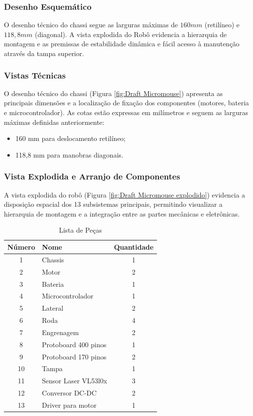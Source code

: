 \subsubsection{Desenho Esquemático}
O desenho técnico do chassi segue as larguras máximas de $160{ mm}$ (retilíneo) e $118,8{ mm}$ (diagonal). A vista explodida do Robô evidencia a hierarquia de montagem e as premissas de estabilidade dinâmica e fácil acesso à manutenção através da tampa
superior.

\subsubsection{Vistas Técnicas}
O desenho técnico do chassi (Figura \ref{fig:Draft Micromouse}) apresenta as principais dimensões e a localização de fixação dos componentes (motores, bateria e microcontrolador). As cotas estão expressas em milímetros e seguem as larguras máximas definidas anteriormente:
\begin{itemize}
    \item 160 mm para deslocamento retilíneo;
    \item 118,8 mm para manobras diagonais.
\end{itemize}

\subsubsection{Vista Explodida e Arranjo de Componentes}
A vista explodida do robô (Figura \ref{fig:Draft Micromouse explodido}) evidencia a disposição espacial dos 13 subsistemas principais, permitindo visualizar a hierarquia de montagem e a integração entre as partes mecânicas e eletrônicas.

\begin{table}[htbp]
\centering
\caption{Lista de Peças}
\label{tab:pecas_micromouse}
\begin{tabular}{@{}clc@{}}
\toprule
\textbf{Número} & \textbf{Nome} & \textbf{Quantidade} \\ \midrule
1 & Chassis & 1 \\
2 & Motor & 2 \\
3 & Bateria & 1 \\
4 & Microcontrolador & 1 \\
5 & Lateral & 2 \\
6 & Roda & 4 \\
7 & Engrenagem & 2 \\
8 & Protoboard 400 pinos & 1 \\
9 & Protoboard 170 pinos & 2 \\
10 & Tampa & 1 \\
11 & Sensor Laser VL53l0x & 3 \\
12 & Conversor DC-DC & 2 \\
13 & Driver para motor & 1 \\ \bottomrule
\end{tabular}
\end{table}

